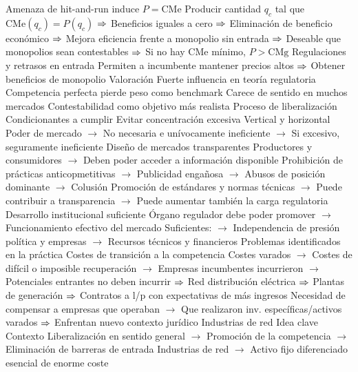 \documentclass{nuevotema}
\begin{document}
\begin{esquemal}
				\4 Amenaza de hit-and-run induce $P=\text{CMe}$
				\4[] Producir cantidad $q_c$ tal que $\text{CMe}(q_c) = P(q_c)$
				\4[] $\Rightarrow$ Beneficios iguales a cero
				\4[] $\Rightarrow$ Eliminación de beneficio económico
				\4[] $\Rightarrow$ Mejora eficiencia frente a monopolio sin entrada
				\4[] $\Rightarrow$ Deseable que monopolios sean contestables
				\4[] $\Rightarrow$ Si no hay CMe mínimo, $P>\text{CMg}$
				\4 Regulaciones y retrasos en entrada
				\4[] Permiten a incumbente mantener precios altos
				\4[] $\Rightarrow$ Obtener beneficios de monopolio
			\3 Valoración
				\4 Fuerte influencia en teoría regulatoria
				\4 Competencia perfecta pierde peso como benchmark
				\4[] Carece de sentido en muchos mercados
				\4 Contestabilidad como objetivo más realista
		\2 Proceso de liberalización
			\3 Condicionantes a cumplir
				\4 Evitar concentración excesiva
				\4[] Vertical y horizontal
				\4[] Poder de mercado
				\4[] $\to$ No necesaria e unívocamente ineficiente
				\4[] $\to$ Si excesivo, seguramente ineficiente
				\4 Diseño de mercados transparentes
				\4[] Productores y consumidores
				\4[] $\to$ Deben poder acceder a información disponible
				\4[] Prohibición de prácticas anticopmetitivas
				\4[] $\to$ Publicidad engañosa
				\4[] $\to$ Abusos de posición dominante
				\4[] $\to$ Colusión
				\4[] Promoción de estándares y normas técnicas
				\4[] $\to$ Puede contribuir a transparencia
				\4[] $\to$ Puede aumentar también la carga regulatoria
				\4 Desarrollo institucional suficiente
				\4[] Órgano regulador debe poder promover
				\4[] $\to$ Funcionamiento efectivo del mercado
				\4[] Suficientes:
				\4[] $\to$ Independencia de presión política y empresas
				\4[] $\to$ Recursos técnicos y financieros
			\3 Problemas identificados en la práctica
				\4 Costes de transición a la competencia
				\4[] Costes varados
				\4[] $\to$ Costes de difícil o imposible recuperación
				\4[] $\to$ Empresas incumbentes incurrieron
				\4[] $\to$ Potenciales entrantes no deben incurrir
				\4[] $\Rightarrow$ Red distribución eléctrica
				\4[] $\Rightarrow$ Plantas de generación
				\4[] $\Rightarrow$ Contratos a l/p con expectativas de más ingresos
				\4[] Necesidad de compensar a empresas que operaban 
				\4[] $\to$ Que realizaron inv. específicas/activos varados
				\4[] $\Rightarrow$ Enfrentan nuevo contexto jurídico
		\2 Industrias de red
			\3 Idea clave
				\4 Contexto
				\4[] Liberalización en sentido general
				\4[] $\to$ Promoción de la competencia
				\4[] $\to$ Eliminación de barreras de entrada
				\4[] Industrias de red
				\4[] $\to$ Activo fijo diferenciado esencial de enorme coste

\end{esquemal}
\end{document}
